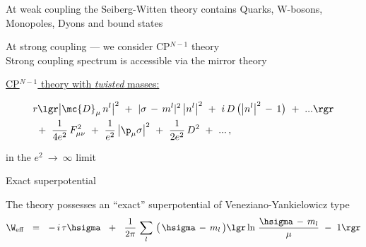 \documentclass{beamer}
\begin{document}
\begin{frame}{}

	At weak coupling the Seiberg-Witten theory contains
	\alert{Quarks}, \alert{W-bosons}, \alert{Monopoles}, \alert{Dyons} and \alert{bound states}

\vspace{7mm}
	At strong coupling --- we consider CP$^{N-1}$ theory\\
	Strong coupling spectrum is accessible via the mirror theory
\end{frame}


\begin{frame}[t]{}

\vspace{2mm}
	\underline{CP$^{N-1}$ theory with {\it twisted} masses:}

\begin{align*}
%
	&
	r \lgr \big| \mc{D}_\mu \, n^l \big|^2  ~+~ | \sigma \,-\, m^l |^2 \, \big| n^l \big|^2 
		~+~ i\, D\, \big( \big| n^l \big|^2 \,-\, 1 \big) ~+~ ... \rgr
	\\
%
	&
	~+~ \frac{1}{4e^2}\, F_{\mu\nu}^2 ~+~ \frac{1}{e^2}\, \big|\p_\mu \sigma\big|^2 
	~+~ \frac{1}{2e^2}\, D^2 ~+~ ...\,,
\end{align*}

	in the $ e^2 ~\to~ \infty $ limit

\vspace{7mm}
\end{frame}


\begin{frame}{Exact superpotential}

	The theory possesses an ``exact'' superpotential of
	Veneziano-Yankielowicz type
\[
	\W_\text{eff} ~~=~~ -\,i\,\tau\hsigma
			~~+~~ \frac{1}{2\pi}\, \sum_l\, \big( \,\hsigma \,-\, m_l\, \big)
				\lgr \ln\, \frac{\hsigma \,-\, m_l}{\mu} ~-~ 1 \rgr
\]

\end{frame}
\end{document}
